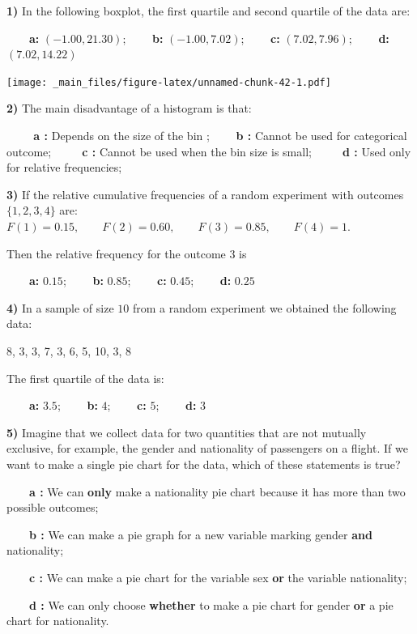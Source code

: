 \documentclass[
]{book}
\begin{document}
\textbf{1)} In the following boxplot, the first quartile and second quartile of the data are:

\textbf{\(\qquad\)a:} \((-1.00, 21.30)\); \textbf{\(\qquad\)b:} \((-1.00, 7.02)\); \textbf{\(\qquad\)c:} \((7.02, 7.96)\); \textbf{\(\qquad\)d:} \((7.02, 14.22)\)

\texttt{[image: \_main\_files/figure-latex/unnamed-chunk-42-1.pdf]}

\textbf{2)} The main disadvantage of a histogram is that:

\textbf{\(\qquad\) a :} Depends on the size of the bin ; \textbf{\(\qquad\)b :} Cannot be used for categorical outcome;
\textbf{\(\qquad\) c :} Cannot be used when the bin size is small;
\textbf{\(\qquad\) d :} Used only for relative frequencies;

\textbf{3)} If the relative cumulative frequencies of a random experiment with outcomes \(\{1,2,3,4\}\) are: \(F(1)=0.15, \qquad F(2)=0.60, \qquad F(3)=0.85, \qquad F(4)=1\).

Then the relative frequency for the outcome \(3\) is

\textbf{\(\qquad\)a:} \(0.15\); \textbf{\(\qquad\)b:} \(0.85\); \textbf{\(\qquad\)c:} \(0.45\); \textbf{\(\qquad\)d:} \(0.25\)

\textbf{4)} In a sample of size \(10\) from a random experiment we obtained the following data:

8, 3, 3, 7, 3, 6, 5, 10, 3, 8

The first quartile of the data is:

\textbf{\(\qquad\)a:} \(3.5\); \textbf{\(\qquad\)b:} \(4\); \textbf{\(\qquad\)c:} \(5\); \textbf{\(\qquad\)d:} \(3\)

\textbf{5)} Imagine that we collect data for two quantities that are not mutually exclusive, for example, the gender and nationality of passengers on a flight. If we want to make a single pie chart for the data, which of these statements is true?

\textbf{\(\qquad\)a :} We can \textbf{only} make a nationality pie chart because it has more than two possible outcomes;

\textbf{\(\qquad\)b :} We can make a pie graph for a new variable marking gender \textbf{and} nationality;

\textbf{\(\qquad\)c :} We can make a pie chart for the variable sex \textbf{or} the variable nationality;

\textbf{\(\qquad\)d :} We can only choose \textbf{whether} to make a pie chart for gender \textbf{or} a pie chart for nationality.
\end{document}
